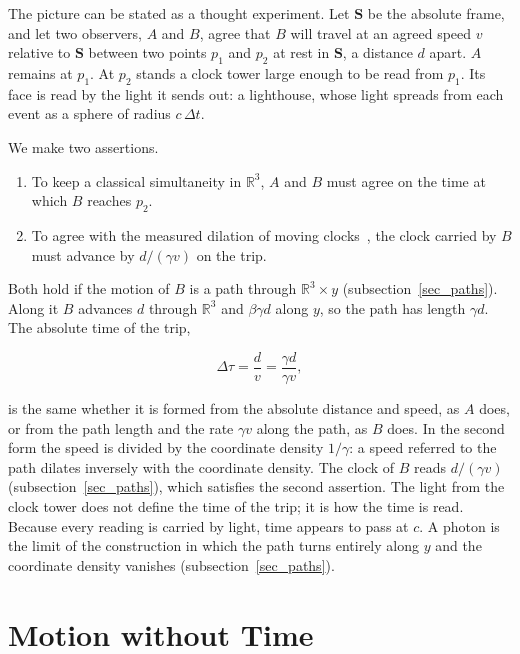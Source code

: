 \documentclass{iopjournal}
\begin{document}
The picture can be stated as a thought experiment. Let $\mathbf{S}$ be the absolute frame, and let two observers, $A$ and $B$, agree that $B$ will travel at an agreed speed $v$ relative to $\mathbf{S}$ between two points $p_1$ and $p_2$ at rest in $\mathbf{S}$, a distance $d$ apart. $A$ remains at $p_1$. At $p_2$ stands a clock tower large enough to be read from $p_1$. Its face is read by the light it sends out: a lighthouse, whose light spreads from each event as a sphere of radius $c\,\Delta t$.

We make two assertions.

\begin{enumerate}[label=\arabic*.]
\item To keep a classical simultaneity in $\mathbb{R}^{3}$, $A$ and $B$ must agree on the time at which $B$ reaches $p_{2}$.
\item To agree with the measured dilation of moving clocks~\cite{Rossi1941, FrischSmith1963, Bailey1977, Bailey1979, Botermann2014}, the clock carried by $B$ must advance by $d/(\gamma v)$ on the trip.
\end{enumerate}

Both hold if the motion of $B$ is a path through $\mathbb{R}^3\times y$ (subsection~\ref{sec_paths}). Along it $B$ advances $d$ through $\mathbb{R}^3$ and $\beta\gamma d$ along $y$, so the path has length $\gamma d$. The absolute time of the trip,

\begin{equation}\label{eq_lighthouse_time}
    \Delta\tau=\frac{d}{v}=\frac{\gamma d}{\gamma v},
\end{equation}

is the same whether it is formed from the absolute distance and speed, as $A$ does, or from the path length and the rate $\gamma v$ along the path, as $B$ does. In the second form the speed is divided by the coordinate density $1/\gamma$: a speed referred to the path dilates inversely with the coordinate density. The clock of $B$ reads $d/(\gamma v)$ (subsection~\ref{sec_paths}), which satisfies the second assertion. The light from the clock tower does not define the time of the trip; it is how the time is read. Because every reading is carried by light, time appears to pass at $c$. A photon is the limit of the construction in which the path turns entirely along $y$ and the coordinate density vanishes (subsection~\ref{sec_paths}).

\section{Motion without Time}\label{sec_motion}
\end{document}
